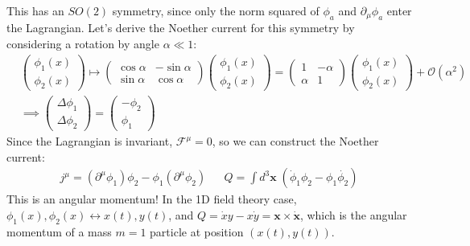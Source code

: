 \documentclass[12pt, oneside]{article}   	%
\theoremstyle{definition}
\begin{document}
\begin{itemize}
	This has an $SO(2)$ symmetry, since only the norm squared of $\phi_a$ and $\partial_\mu\phi_a$ enter the Lagrangian. Let's derive the Noether current for this symmetry by considering a rotation by angle $\alpha\ll 1$:
	\begin{align}
		&\begin{pmatrix} \phi_1(x) \\ \phi_2(x) \end{pmatrix} \mapsto \begin{pmatrix} \cos\alpha & -\sin\alpha \\ \sin\alpha & \cos\alpha \end{pmatrix} \begin{pmatrix} \phi_1(x) \\ \phi_2(x) \end{pmatrix} = \begin{pmatrix} 1 & -\alpha \\ \alpha & 1 \end{pmatrix} \begin{pmatrix} \phi_1(x) \\ \phi_2(x) \end{pmatrix} + \mathcal{O}(\alpha^2) \\
		&\implies \begin{pmatrix} \Delta\phi_1 \\ \Delta \phi_2 \end{pmatrix} = \begin{pmatrix} -\phi_2 \\ \phi_1 \end{pmatrix}
	\end{align}
	Since the Lagrangian is invariant, $\mathcal F^\mu = 0$, so we can construct the Noether current:
	\begin{align}
		j^\mu = (\partial^\mu \phi_1) \phi_2 - \phi_1 (\partial^\mu \phi_2) && Q = \int d^3\bm x\; (\dot\phi_1 \phi_2 - \phi_1 \dot{\phi_2})
	\end{align}
	This is an angular momentum! In the 1D field theory case, $\phi_1(x), \phi_2(x)\leftrightarrow x(t), y(t)$, and $Q = \dot{x} y - x \dot{y} = \bm x \times \dot{\bm x}$, which is the angular momentum of a mass $m = 1$ particle at position $(x(t), y(t))$. 
	
	
	
	
	

\end{itemize}
\end{document}
